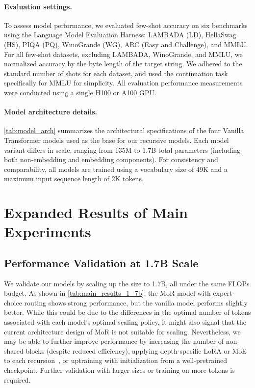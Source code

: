 \vspace{-10pt}
\paragraph{Evaluation settings.}

To assess model performance, we evaluated few-shot accuracy on six benchmarks using the Language Model Evaluation Harness: LAMBADA (LD), HellaSwag (HS), PIQA (PQ), WinoGrande (WG), ARC (Easy and Challenge), and MMLU. For all few-shot datasets, excluding LAMBADA, WinoGrande, and MMLU, we normalized accuracy by the byte length of the target string. We adhered to the standard number of shots for each dataset, and used the continuation task specifically for MMLU for simplicity. 
All evaluation performance measurements were conducted using a single H100 or A100 GPU.


\vspace{-10pt}
\paragraph{Model architecture details.}

\autoref{tab:model_arch} summarizes the architectural specifications of the four Vanilla Transformer models used as the base for our recursive models. Each model variant differs in scale, ranging from 135M to 1.7B total parameters (including both non-embedding and embedding components). For consistency and comparability, all models are trained using a vocabulary size of 49K and a maximum input sequence length of 2K tokens.





\clearpage
\section{Expanded Results of Main Experiments}
\label{app:main_results}


\subsection{Performance Validation at 1.7B Scale}

We validate our models by scaling up the size to 1.7B, all under the same FLOPs budget. As shown in \autoref{tab:main_results_1_7b}, the MoR model with expert-choice routing shows strong performance, but the vanilla model performs slightly better. While this could be due to the differences in the optimal number of tokens associated with each model's optimal scaling policy, it might also signal that the current architecture design of MoR is not suitable for scaling. Nevertheless, we may be able to further improve performance by increasing the number of non-shared blocks (despite reduced efficiency), applying depth-specific LoRA or MoE to each recursion~\citep{bae2024relaxed}, or uptraining with initialization from a well-pretrained checkpoint. Further validation with larger sizes or training on more tokens is required. 


